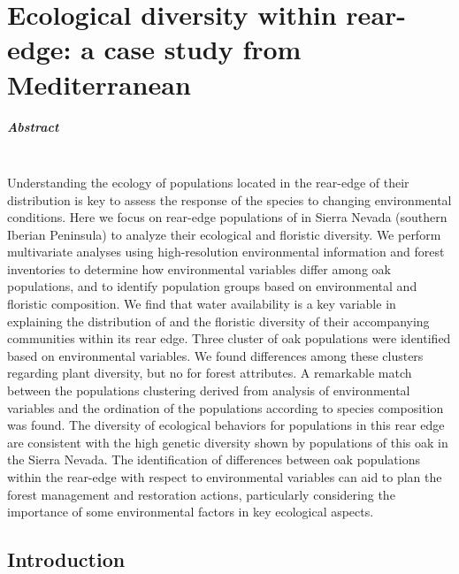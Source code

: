 %

\chapter{Ecological diversity within rear-edge: a case study from Mediterranean \Qpw}\label{sec:multivar}

\newpage

\paragraph{Abstract} \mbox{} \\
Understanding the ecology of populations located in the rear-edge of their distribution is key to assess the response of the species to changing environmental conditions. Here we focus on rear-edge populations of \Qpy in Sierra Nevada (southern Iberian Peninsula) to analyze their ecological and floristic diversity. We perform multivariate analyses using high-resolution environmental information and forest inventories to determine how environmental variables differ among oak populations, and to identify population groups based on environmental and floristic composition.
We find that water availability is a key variable in explaining the distribution of \Qp and the floristic diversity of their accompanying communities within its rear edge. Three cluster of oak populations were identified based on environmental variables. We found differences among these clusters regarding plant diversity, but no for forest attributes. A remarkable match between the populations clustering derived from analysis of environmental variables and the ordination of the populations according to species composition was found.
The diversity of ecological behaviors for \Qp populations in this rear edge are consistent with the high genetic diversity shown by populations of this oak in the Sierra Nevada. The identification of differences between oak populations within the rear-edge with respect to environmental variables can aid to plan the forest management and restoration actions, particularly considering the importance of some environmental factors in key ecological aspects.
\newpage

\section{Introduction}\label{sec:multivar:intro}


